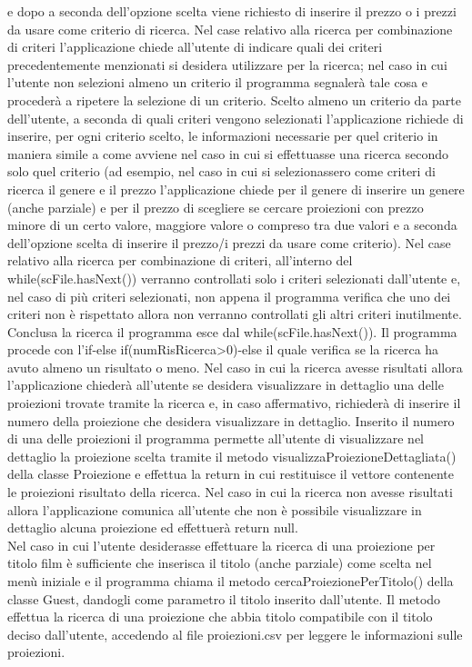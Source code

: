 \documentclass[a4paper,titlepage,openany,12pt]{book}
\begin{document}
e dopo a seconda dell’opzione scelta viene richiesto di inserire il prezzo o i prezzi da usare come criterio di ricerca.
Nel case relativo alla ricerca per combinazione di criteri l’applicazione chiede all’utente di indicare quali dei criteri precedentemente menzionati si desidera utilizzare per la ricerca; nel caso in cui l’utente non selezioni almeno un criterio il programma segnalerà tale cosa e procederà a ripetere la selezione di un criterio.
Scelto almeno un criterio da parte dell’utente, a seconda di quali criteri vengono selezionati l’applicazione richiede di inserire, per ogni criterio scelto, le informazioni necessarie per quel criterio in maniera simile a come avviene nel caso in cui si effettuasse una ricerca secondo solo quel criterio (ad esempio, nel caso in cui si selezionassero come criteri di ricerca il genere e il prezzo l’applicazione chiede per il genere di inserire un genere (anche parziale) e per il prezzo di scegliere se cercare proiezioni con prezzo minore di un certo valore, maggiore valore o compreso tra due valori e a seconda dell’opzione scelta di inserire il prezzo/i prezzi da usare come criterio).
Nel case relativo alla ricerca per combinazione di criteri, all’interno del while(scFile.hasNext()) verranno controllati solo i criteri selezionati dall’utente e, nel caso di più criteri selezionati, non appena il programma verifica che uno dei criteri non è rispettato allora non verranno controllati gli altri criteri inutilmente.
Conclusa la ricerca il programma esce dal while(scFile.hasNext()).
Il programma procede con l’if-else if(numRisRicerca>0)-else il quale verifica se la ricerca ha avuto almeno un risultato o meno.
Nel caso in cui la ricerca avesse risultati allora l’applicazione chiederà all’utente se desidera visualizzare in dettaglio una delle proiezioni trovate tramite la ricerca e, in caso affermativo, richiederà di inserire il numero della proiezione che desidera visualizzare in dettaglio. Inserito il numero di una delle proiezioni il programma permette all’utente di visualizzare nel dettaglio la proiezione scelta tramite il metodo visualizzaProiezioneDettagliata() della classe Proiezione e effettua la return in cui restituisce il vettore contenente le proiezioni risultato della ricerca.
Nel caso in cui la ricerca non avesse risultati allora l’applicazione comunica all’utente che non è possibile visualizzare in dettaglio alcuna proiezione ed effettuerà return null.\\
Nel caso in cui l’utente desiderasse effettuare la ricerca di una proiezione per titolo film è sufficiente che inserisca il titolo (anche parziale) come scelta nel menù iniziale e il programma chiama il metodo cercaProiezionePerTitolo() della classe Guest, dandogli come parametro il titolo inserito dall’utente. Il metodo effettua la ricerca di una proiezione che abbia titolo compatibile con il titolo deciso dall’utente, accedendo al file proiezioni.csv per leggere le informazioni sulle proiezioni.
\end{document}
